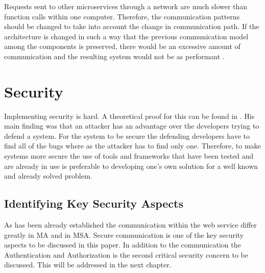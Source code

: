 \begin{sloppypar}
    Requests sent to other microservices through a network are much slower than
    function calls within one computer. Therefore, the communication patterns
    should be changed to take into account the change in communication path. If
    the architecture is changed in such a way that the previous communication
    model among the components is preserved, there would be an excessive amount
    of communication and the resulting system would not be as performant
    \citep{fowlerlewisms}. 
\end{sloppypar}




\section{Security}
\begin{sloppypar}
    Implementing security is hard. A theoretical proof for this can be found in
    \citet{andersson2001information}. His main finding was that an attacker has
    an advantage over the developers trying to defend a system. For the system
    to be secure the defending developers have to find all of the bugs where as
    the attacker has to find only one. Therefore, to make systems more secure
    the use of tools and frameworks that have been tested and are already in use
    is preferable to developing one's own solution for a well known and already
    solved problem.
\end{sloppypar}
\subsection{Identifying Key Security Aspects}
\begin{sloppypar}
    As has been already established the communication within the web service
    differ greatly in MA and in MSA. Secure communication is one of the key
    security aspects to be discussed in this paper. In addition to the
    communication the Authentication and Authorization is the second critical
    security concern to be discussed. This will be addressed in the next
    chapter.
\end{sloppypar}

